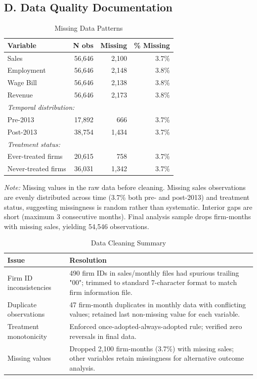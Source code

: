 \documentclass{article}
\begin{document}
\clearpage

\subsection*{D. Data Quality Documentation}

\begin{table}[H]
\centering
\caption{Missing Data Patterns}
\label{tab:missing}
\begin{tabular}{lrrr}
\toprule
Variable & N obs & Missing & \% Missing \\
\midrule
Sales & 56,646 & 2,100 & 3.7\% \\
Employment & 56,646 & 2,148 & 3.8\% \\
Wage Bill & 56,646 & 2,138 & 3.8\% \\
Revenue & 56,646 & 2,173 & 3.8\% \\
\midrule
\multicolumn{4}{l}{\textit{Temporal distribution:}} \\
\quad Pre-2013 & 17,892 & 666 & 3.7\% \\
\quad Post-2013 & 38,754 & 1,434 & 3.7\% \\
\midrule
\multicolumn{4}{l}{\textit{Treatment status:}} \\
\quad Ever-treated firms & 20,615 & 758 & 3.7\% \\
\quad Never-treated firms & 36,031 & 1,342 & 3.7\% \\
\bottomrule
\end{tabular}
\begin{tablenotes}[flushleft]
\small
\item \textit{Note:} Missing values in the raw data before cleaning. Missing sales observations are evenly distributed across time (3.7\% both pre- and post-2013) and treatment status, suggesting missingness is random rather than systematic. Interior gaps are short (maximum 3 consecutive months). Final analysis sample drops firm-months with missing sales, yielding 54,546 observations.
\end{tablenotes}
\end{table}

\begin{table}[H]
\centering
\caption{Data Cleaning Summary}
\label{tab:cleaning}
\begin{tabular}{lp{10cm}}
\toprule
Issue & Resolution \\
\midrule
Firm ID inconsistencies & 490 firm IDs in sales/monthly files had spurious trailing "00"; trimmed to standard 7-character format to match firm information file. \\
\addlinespace
Duplicate observations & 47 firm-month duplicates in monthly data with conflicting values; retained last non-missing value for each variable. \\
\addlinespace
Treatment monotonicity & Enforced once-adopted-always-adopted rule; verified zero reversals in final data. \\
\addlinespace
Missing values & Dropped 2,100 firm-months (3.7\%) with missing sales; other variables retain missingness for alternative outcome analysis. \\
\bottomrule
\end{tabular}
\end{table}
\end{document}

